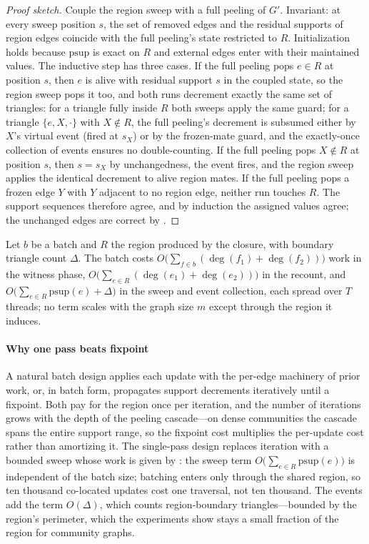 \begin{proof}[Proof sketch]
Couple the region sweep with a full peeling of $G'$.
Invariant: at every sweep position $s$, the set of removed edges and the residual supports of region edges coincide with the full peeling's state restricted to $R$.
Initialization holds because $\mathrm{psup}$ is exact on $R$ and external edges enter with their maintained values.
The inductive step has three cases.
If the full peeling pops $e\in R$ at position $s$, then $e$ is alive with residual support $s$ in the coupled state, so the region sweep pops it too, and both runs decrement exactly the same set of triangles: for a triangle fully inside $R$ both sweeps apply the same guard; for a triangle $\{e,X,\cdot\}$ with $X\notin R$, the full peeling's decrement is subsumed either by $X$'s virtual event (fired at $s_X$) or by the frozen-mate guard, and the exactly-once collection of events ensures no double-counting.
If the full peeling pops $X\notin R$ at position $s$, then $s=s_X$ by unchangedness, the event fires, and the region sweep applies the identical decrement to alive region mates.
If the full peeling pops a frozen edge $Y$ with $Y$ adjacent to no region edge, neither run touches $R$.
The support sequences therefore agree, and by induction the assigned values agree; the unchanged edges are correct by .
\end{proof}

\begin{proposition}
\label{prop:work}
Let $b$ be a batch and $R$ the region produced by the closure, with boundary triangle count $\Delta$.
The batch costs $O\!\big(\sum_{f\in b}(\deg(f_1)+\deg(f_2))\big)$ work in the witness phase, $O\!\big(\sum_{e\in R}(\deg(e_1)+\deg(e_2))\big)$ in the recount, and $O\!\big(\sum_{e\in R}\mathrm{psup}(e) + \Delta\big)$ in the sweep and event collection, each spread over $T$ threads; no term scales with the graph size $m$ except through the region it induces.
\end{proposition}

\paragraph{Why one pass beats fixpoint}
A natural batch design applies each update with the per-edge machinery of prior work, or, in batch form, propagates support decrements iteratively until a fixpoint.
Both pay for the region once per iteration, and the number of iterations grows with the depth of the peeling cascade---on dense communities the cascade spans the entire support range, so the fixpoint cost multiplies the per-update cost rather than amortizing it.
The single-pass design replaces iteration with a bounded sweep whose work is given by : the sweep term $O\!\big(\sum_{e\in R}\mathrm{psup}(e)\big)$ is independent of the batch size; batching enters only through the shared region, so ten thousand co-located updates cost one traversal, not ten thousand.
The events add the term $O(\Delta)$, which counts region-boundary triangles---bounded by the region's perimeter, which the experiments show stays a small fraction of the region for community graphs.
